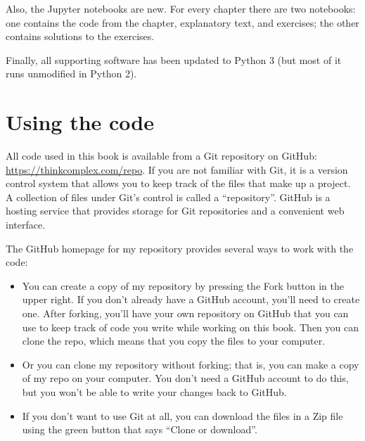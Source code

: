 \documentclass[12pt]{book}
\theoremstyle{exercise}
\begin{document}
Also, the Jupyter notebooks are new.  For every chapter there are two notebooks: one contains the code from the chapter, explanatory text, and exercises; the other contains solutions to the exercises.


Finally, all supporting software has been updated to Python 3 (but most of it runs unmodified in Python 2).


\section{Using the code}
\label{code}


All code used in this book is available from a Git repository on GitHub:
\url{https://thinkcomplex.com/repo}.  
If you are not familiar with Git, it is a 
version control system that allows you to keep track of the files that
make up a project.  A collection of files under Git's control is
called a ``repository''.  GitHub is a hosting service that provides
storage for Git repositories and a convenient web interface.


The GitHub homepage for my repository provides several ways to
work with the code:

\begin{itemize}

\item You can create a copy of my repository by pressing the {\sf
  Fork} button in the upper right.  If you don't already have a GitHub
  account, you'll need to create one.  After forking, you'll have your
  own repository on GitHub that you can use to keep track of code you
  write while working on this book.  Then you can clone the repo,
  which means that you copy the files to your computer.


\item Or you can clone my repository without forking; that is, you can
  make a copy of my repo on your computer.  You don't need a GitHub
  account to do this, but you won't be able to write your changes back
  to GitHub.


\item If you don't want to use Git at all, you can download the files
  in a Zip file using the green button that says ``Clone or download''.

\end{itemize}
\end{document}
